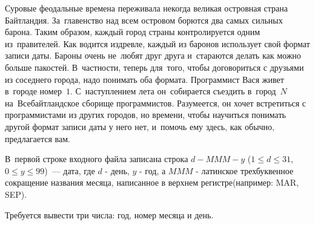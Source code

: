 
Суровые феодальные времена переживала некогда великая островная страна
Байтландия. За~главенство над всем островом борются два самых сильных барона.
Таким образом, каждый город страны контролируется одним из~правителей. Как
водится издревле, каждый из баронов использует свой формат записи даты. Бароны очень
не~любят друг друга и~стараются делать как можно больше пакостей. В~частности,
теперь для~того, чтобы договориться с друзьями из соседнего города, надо понимать оба формата. Программист Вася живет в~городе номер~$1$. С~наступлением лета
он~собирается съездить в~город~$N$ на~Всебайтландское сборище программистов.
Разумеется, он хочет встретиться с программистами из других городов, но  времени,
чтобы научиться понимать другой формат записи даты у него нет, и~помочь ему здесь, как обычно, предлагается вам.


\InputFile
В~первой строке входного файла записана строка $d-MMM-y$ ($1 \leqslant d \leqslant
31$, $0 \leqslant y \leqslant 99$)~--- дата, где $d$ - день, $y$ - год, а $MMM$ - латинское трехбуквенное сокращение названия месяца, написанное в верхнем регистре(например: MAR, SEP).


\OutputFile
Требуется вывести три числа: год, номер месяца и день.
